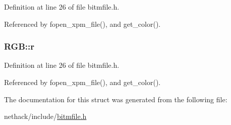 Definition at line 26 of file bitmfile.\+h.



Referenced by fopen\+\_\+xpm\+\_\+file(), and get\+\_\+color().

\hypertarget{structRGB_a6eac0c096c68d7367b091228f15ba61c}{
\subsubsection[{r}]{ R\+G\+B\+::r}}\label{structRGB_a6eac0c096c68d7367b091228f15ba61c}


Definition at line 26 of file bitmfile.\+h.



Referenced by fopen\+\_\+xpm\+\_\+file(), and get\+\_\+color().



The documentation for this struct was generated from the following file\+:\begin{DoxyCompactItemize}
\item 
nethack/include/\hyperlink{bitmfile_8h}{bitmfile.\+h}\end{DoxyCompactItemize}
